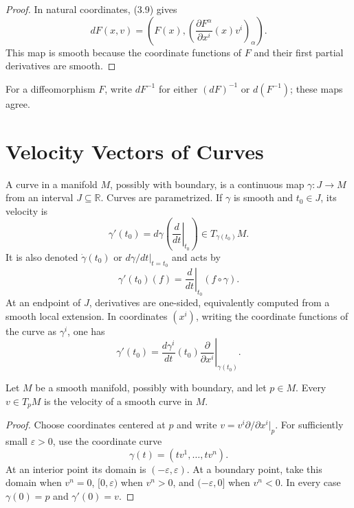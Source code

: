 \begin{proof}
\sketch
In natural coordinates, (3.9) gives
\[
dF(x,v)=
\left(F(x),
\left(\frac{\partial F^\alpha}{\partial x^i}(x)v^i\right)_\alpha\right).
\]
This map is smooth because the coordinate functions of $F$ and their first
partial derivatives are smooth.
\end{proof}

\begin{notation}
\label{not:3-16-extra-4}
\leanok
For a diffeomorphism $F$, write $dF^{-1}$ for either $(dF)^{-1}$ or
$d(F^{-1})$; these maps agree.
\end{notation}


\section{Velocity Vectors of Curves}

\begin{definition}
\label{def:3-17-extra-1}
\leanok
A curve in a manifold $M$, possibly with boundary, is a continuous map
$\gamma:J\to M$ from an interval $J\subseteq\mathbb{R}$. Curves are
parametrized. If $\gamma$ is smooth and $t_0\in J$, its velocity is
\[
\gamma'(t_0)
=d\gamma\left(\left.\frac{d}{dt}\right|_{t_0}\right)
\in T_{\gamma(t_0)}M.
\]
It is also denoted $\dot\gamma(t_0)$ or $d\gamma/dt|_{t=t_0}$ and acts by
\[
\gamma'(t_0)(f)=\left.\frac{d}{dt}\right|_{t_0}(f\circ\gamma).
\]
At an endpoint of $J$, derivatives are one-sided, equivalently computed from
a smooth local extension. In coordinates $(x^i)$, writing the coordinate
functions of the curve as $\gamma^i$, one has
\[
\gamma'(t_0)
=\left.\frac{d\gamma^i}{dt}(t_0)
  \frac{\partial}{\partial x^i}\right|_{\gamma(t_0)}.
\]
\end{definition}

\begin{proposition}
\label{prop:3-23}
\leanok
{}
Let $M$ be a smooth manifold, possibly with boundary, and let $p\in M$. Every
$v\in T_pM$ is the velocity of a smooth curve in $M$.
\end{proposition}

\begin{proof}
\leanok
\sketch
Choose coordinates centered at $p$ and write
$v=v^i\partial/\partial x^i|_p$. For sufficiently small $\varepsilon>0$, use
the coordinate curve
\[
\gamma(t)=(tv^1,\ldots,tv^n). \tag{3.14}
\]
At an interior point its domain is $(-\varepsilon,\varepsilon)$. At a boundary
point, take this domain when $v^n=0$, $[0,\varepsilon)$ when $v^n>0$, and
$(-\varepsilon,0]$ when $v^n<0$. In every case $\gamma(0)=p$ and
$\gamma'(0)=v$.
\end{proof}

